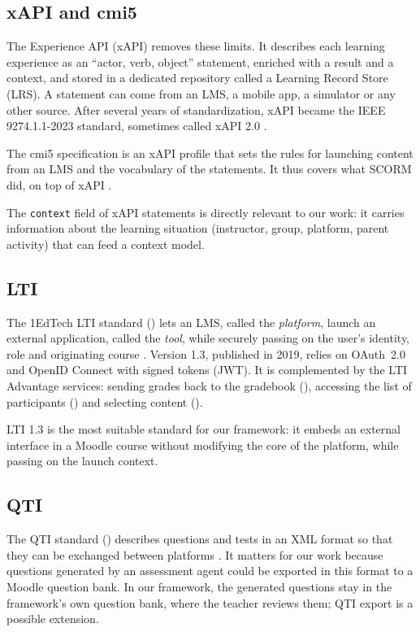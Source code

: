 \subsection{xAPI and cmi5}

The Experience API (xAPI) removes these limits. It describes each learning
experience as an \enquote{actor, verb, object} statement, enriched with a
result and a context, and stored in a dedicated repository called a
Learning Record Store (LRS). A statement can come from an LMS, a mobile
app, a simulator or any other source. After several years of
standardization, xAPI became the IEEE 9274.1.1-2023 standard, sometimes
called xAPI 2.0 \cite{ieee_xapi,adl_xapi2023}.

The cmi5 specification is an xAPI profile that sets the rules for
launching content from an LMS and the vocabulary of the statements. It
thus covers what SCORM did, on top of xAPI \cite{adl_cmi5}.

The \texttt{context} field of xAPI statements is directly relevant to our
work: it carries information about the learning situation (instructor,
group, platform, parent activity) that can feed a context model.

\subsection{LTI}

The 1EdTech LTI standard () lets
an LMS, called the \emph{platform}, launch an external application, called
the \emph{tool}, while securely passing on the user's identity, role and
originating course \cite{lti13}. Version 1.3, published in 2019, relies on
OAuth~2.0 and OpenID Connect with signed tokens (JWT). It is complemented
by the LTI Advantage services: sending grades back to the gradebook
(), accessing the list of
participants () and
selecting content ().

LTI 1.3 is the most suitable standard for our framework: it embeds an
external interface in a Moodle course without modifying the core of the
platform, while passing on the launch context.

\subsection{QTI}

The QTI standard () describes
questions and tests in an XML format so that they can be exchanged between
platforms \cite{qti3}. It matters for our work because questions generated
by an assessment agent could be exported in this format to a Moodle
question bank. In our framework, the generated questions stay in the
framework's own question bank, where the teacher reviews them; QTI export
is a possible extension.

